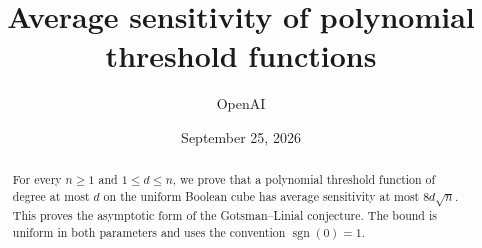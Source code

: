\documentclass[11pt]{article}
\title{Average sensitivity of polynomial threshold functions}
\author{OpenAI}
\date{September 25, 2026}
\newcommand{\sgn}{\operatorname{sgn}}
\begin{document}
\maketitle
\begin{abstract}
For every $n\ge1$ and $1\le d\le n$, we prove that a polynomial
threshold function of degree at most $d$ on the uniform Boolean cube has
average sensitivity at most $8d\sqrt n$. This proves the asymptotic form
of the Gotsman--Linial conjecture. The bound is uniform in both parameters
and uses the convention $\sgn(0)=1$.
\end{abstract}








\end{document}
